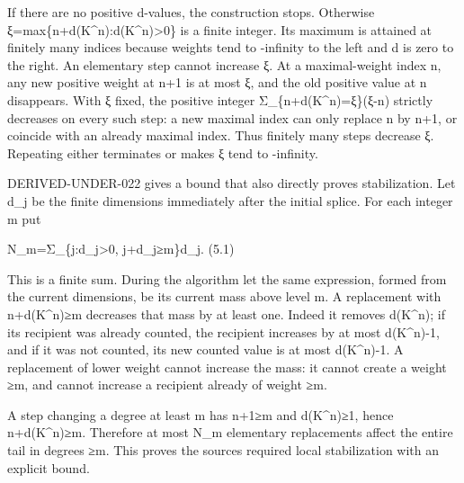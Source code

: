 \documentclass[11pt]{article}
\begin{document}
If there are no positive d-values,\allowbreak{} the construction stops. Otherwise ξ\allowbreak{}=max\{n\allowbreak{}+d(K\textasciicircum{}n)\allowbreak{}:\allowbreak{}d(K\textasciicircum{}n)\allowbreak{}>0\} is a finite integer. Its maximum is attained at finitely many indices because weights tend to -infinity to the left and d is zero to the right. An elementary step cannot increase ξ. At a maximal-weight index n,\allowbreak{} any new positive weight at n\allowbreak{}+1 is at most ξ,\allowbreak{} and the old positive value at n disappears. With ξ fixed,\allowbreak{} the positive integer Σ\_\allowbreak{}\{n\allowbreak{}+d(K\textasciicircum{}n)\allowbreak{}\allowbreak{}=ξ\}(ξ-n)\allowbreak{} strictly decreases on every such step:\allowbreak{} a new maximal index can only replace n by n\allowbreak{}+1,\allowbreak{} or coincide with an already maximal index. Thus finitely many steps decrease ξ. Repeating either terminates or makes ξ tend to -infinity.

DERIVED-UNDER-022 gives a bound that also directly proves stabilization. Let d\_\allowbreak{}j be the finite dimensions immediately after the initial splice. For each integer m put

N\_\allowbreak{}m\allowbreak{}=Σ\_\allowbreak{}\{j:\allowbreak{}d\_\allowbreak{}j>0,\allowbreak{} j\allowbreak{}+d\_\allowbreak{}j≥m\}d\_\allowbreak{}j. (5.1)\allowbreak{}

This is a finite sum. During the algorithm let the same expression,\allowbreak{} formed from the current dimensions,\allowbreak{} be its current mass above level m. A replacement with n\allowbreak{}+d(K\textasciicircum{}n)\allowbreak{}≥m decreases that mass by at least one. Indeed it removes d(K\textasciicircum{}n)\allowbreak{}; if its recipient was already counted,\allowbreak{} the recipient increases by at most d(K\textasciicircum{}n)\allowbreak{}-1,\allowbreak{} and if it was not counted,\allowbreak{} its new counted value is at most d(K\textasciicircum{}n)\allowbreak{}-1. A replacement of lower weight cannot increase the mass:\allowbreak{} it cannot create a weight ≥m,\allowbreak{} and cannot increase a recipient already of weight ≥m.

A step changing a degree at least m has n\allowbreak{}+1≥m and d(K\textasciicircum{}n)\allowbreak{}≥1,\allowbreak{} hence n\allowbreak{}+d(K\textasciicircum{}n)\allowbreak{}≥m. Therefore at most N\_\allowbreak{}m elementary replacements affect the entire tail in degrees ≥m. This proves the source\textquotesingle s required local stabilization with an explicit bound.
\end{document}
